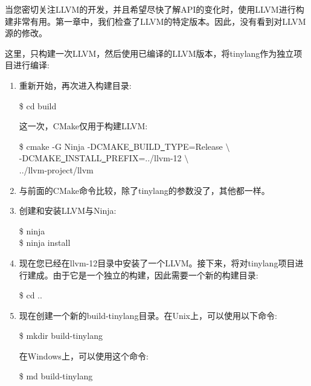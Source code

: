 当您密切关注LLVM的开发，并且希望尽快了解API的变化时，使用LLVM进行构建非常有用。第一章中，我们检查了LLVM的特定版本。因此，没有看到对LLVM源的修改。\par

这里，只构建一次LLVM，然后使用已编译的LLVM版本，将tinylang作为独立项目进行编译:\par

\begin{enumerate}
	\item 重新开始，再次进入构建目录:
	\begin{tcolorbox}[colback=white,colframe=black]
		\$ cd build
	\end{tcolorbox}
	这一次，CMake仅用于构建LLVM:
	\begin{tcolorbox}[colback=white,colframe=black]
		\$ cmake -G Ninja -DCMAKE\underline{~}BUILD\underline{~}TYPE=Release $\setminus$ \\
		\hspace*{1cm}-DCMAKE\underline{~}INSTALL\underline{~}PREFIX=../llvm-12 $\setminus$ \\
		\hspace*{1cm}../llvm-project/llvm
	\end{tcolorbox}

	\item 与前面的CMake命令比较，除了tinylang的参数没了，其他都一样。
	
	\item 创建和安装LLVM与Ninja:
	\begin{tcolorbox}[colback=white,colframe=black]
		\$ ninja \\
		\$ ninja install
	\end{tcolorbox}

	\item 现在您已经在llvm-12目录中安装了一个LLVM。接下来，将对tinylang项目进行建成。由于它是一个独立的构建，因此需要一个新的构建目录:
	\begin{tcolorbox}[colback=white,colframe=black]
		\$ cd ..
	\end{tcolorbox}
	
	\item 现在创建一个新的build-tinylang目录。在Unix上，可以使用以下命令:
	\begin{tcolorbox}[colback=white,colframe=black]
		\$ mkdir build-tinylang
	\end{tcolorbox}

	在Windows上，可以使用这个命令:
	\begin{tcolorbox}[colback=white,colframe=black]
		\$ md build-tinylang
	\end{tcolorbox}


\end{enumerate}
